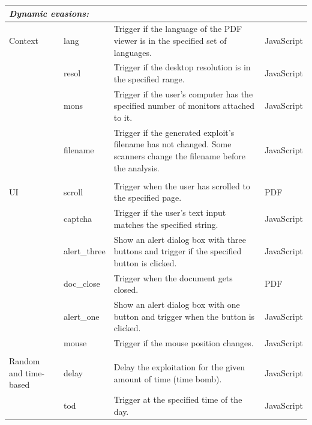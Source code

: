 \begin{table}[t]
\begin{tabular}{@{}p{6em}p{6em}p{39em}p{7.5em}@{}}
\midrule 
\multicolumn{3}{l}{\emph{Dynamic evasions:}}\\
\midrule 
Context               & lang & Trigger if the language of the PDF viewer 
is in the specified set of languages. & JavaScript \\

                          & resol & Trigger if the desktop resolution is 
                          in the specified range. & JavaScript \\
                          
                          & mons & Trigger if the user's computer has the specified 
                          number of monitors attached to it. & JavaScript  \\

                          & filename & Trigger if the generated exploit's 
                          filename has not changed. Some scanners change the filename before the analysis. & JavaScript \\

\\
UI                        & scroll & Trigger when the user has scrolled 
                            to the specified page. & PDF \\

                            & captcha & Trigger if the user's text 
                            input matches the specified string. & JavaScript \\
                            
                            & alert\_three & Show an alert dialog box with 
                            three buttons and trigger if the specified                       
                            button is clicked. & JavaScript \\
                
                            & doc\_close & Trigger when the document gets 
                            closed. & PDF  \\
                            
                            & alert\_one & Show an alert dialog box with one                                
button and trigger when the button is clicked. & JavaScript \\
                            
                            & mouse & Trigger if the mouse position 
                            changes. & JavaScript \\
\\
Random and time-based   & delay & Delay the exploitation for the                                
given amount of time (time bomb). & JavaScript \\

                            & tod & Trigger at the specified time of the day. & JavaScript  
                            \\

\bottomrule
\end{tabular}
\end{table}

